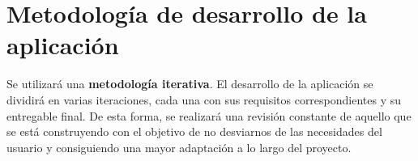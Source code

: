 \section{Metodología de desarrollo de la aplicación}

Se utilizará una \textbf{metodología iterativa}. El desarrollo de la aplicación se dividirá en varias iteraciones, cada una con sus requisitos correspondientes y su entregable final. De esta forma, se realizará una revisión constante de aquello que se está construyendo con el objetivo de no desviarnos de las necesidades del usuario y consiguiendo una mayor adaptación a lo largo del proyecto. 